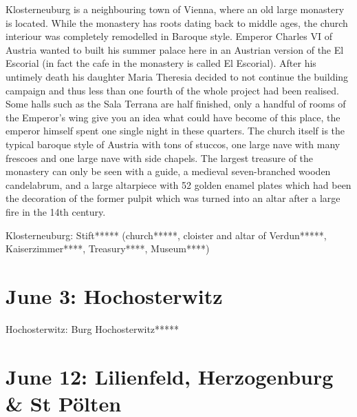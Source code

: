Klosterneuburg is a neighbouring town of Vienna, where an old large monastery is located. While the monastery has roots dating back to middle ages, the church interiour was completely remodelled in Baroque style. Emperor Charles VI of Austria wanted to built his summer palace here in an Austrian version of the El Escorial (in fact the cafe in the monastery is called El Escorial). After his untimely death his daughter Maria Theresia decided to not continue the building campaign and thus less than one fourth of the whole project had been realised. Some halls such as the Sala Terrana are half finished, only a handful of rooms of the Emperor's wing give you an idea what could have become of this place, the emperor himself spent one single night in these quarters. The church itself is the typical baroque style of Austria with tons of stuccos, one large nave with many frescoes and one large nave with side chapels. The largest treasure of the monastery can only be seen with a guide, a medieval seven-branched wooden candelabrum, and a large altarpiece with 52 golden enamel plates which had been the decoration of the former pulpit which was turned into an altar after a large fire in the 14th century.

Klosterneuburg: Stift***** (church*****, cloister and altar of Verdun*****, Kaiserzimmer****, Treasury****, Museum****)


\section{June 3: Hochosterwitz}
\label{2021Hochosterwitz}

Hochosterwitz: Burg Hochosterwitz*****

\section{June 12: Lilienfeld, Herzogenburg \& St P\"olten}
\label{2021Lilienfeld}

